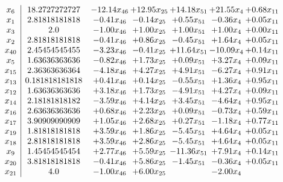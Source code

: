 \documentclass[8pt]{article}
\begin{document}
\[\begin{array}{c| c c@{\hskip 2pt} c@{\hskip 2pt} c@{\hskip 2pt} c@{\hskip 2pt} c@{\hskip 2pt} }
 x_{6}   &  18.2727272727 & -12.14 x_{46} & + 12.95 x_{25} & + 14.18 x_{51} & + 21.55 x_{4} & +  0.68 x_{11}\\
 x_{1}   &  2.81818181818 & -0.41 x_{46} & -0.14 x_{25} & +  0.55 x_{51} & -0.36 x_{4} & +  0.05 x_{11}\\
 x_{3}   &  2.0 & -1.00 x_{46} & +  1.00 x_{25} & +  1.00 x_{51} & +  1.00 x_{4} & +  0.00 x_{11}\\
 x_{2}   &  2.81818181818 & -0.41 x_{46} & +  0.86 x_{25} & -0.45 x_{51} & +  1.64 x_{4} & +  0.05 x_{11}\\
 x_{40}   &  2.45454545455 & -3.23 x_{46} & -0.41 x_{25} & + 11.64 x_{51} & -10.09 x_{4} & +  0.14 x_{11}\\
 x_{5}   &  1.63636363636 & -0.82 x_{46} & +  1.73 x_{25} & +  0.09 x_{51} & +  3.27 x_{4} & +  0.09 x_{11}\\
 x_{15}   &  2.36363636364 & -4.18 x_{46} & +  4.27 x_{25} & +  4.91 x_{51} & -6.27 x_{4} & +  0.91 x_{11}\\
 x_{13}   &  0.181818181818 & +  0.41 x_{46} & +  0.14 x_{25} & -0.55 x_{51} & +  1.36 x_{4} & +  0.95 x_{11}\\
 x_{12}   &  1.63636363636 & +  3.18 x_{46} & +  1.73 x_{25} & -4.91 x_{51} & +  4.27 x_{4} & +  0.09 x_{11}\\
 x_{14}   &  2.18181818182 & -3.59 x_{46} & +  4.14 x_{25} & +  3.45 x_{51} & -4.64 x_{4} & +  0.95 x_{11}\\
 x_{16}   &  2.63636363636 & +  0.68 x_{46} & +  2.23 x_{25} & +  0.09 x_{51} & -0.73 x_{4} & +  0.59 x_{11}\\
 x_{17}   &  3.90909090909 & +  1.05 x_{46} & +  2.68 x_{25} & +  0.27 x_{51} & -1.18 x_{4} & +  0.77 x_{11}\\
 x_{19}   &  1.81818181818 & +  3.59 x_{46} & +  1.86 x_{25} & -5.45 x_{51} & +  4.64 x_{4} & +  0.05 x_{11}\\
 x_{18}   &  2.81818181818 & +  3.59 x_{46} & +  2.86 x_{25} & -5.45 x_{51} & +  4.64 x_{4} & +  0.05 x_{11}\\
 x_{9}   &  1.45454545454 & +  2.77 x_{46} & +  5.59 x_{25} & -11.36 x_{51} & +  7.91 x_{4} & +  0.14 x_{11}\\
 x_{20}   &  3.81818181818 & -0.41 x_{46} & +  5.86 x_{25} & -1.45 x_{51} & -0.36 x_{4} & +  0.05 x_{11}\\
 x_{21}   &  4.0 & -1.00 x_{46} & +  6.00 x_{25} &   & -2.00 x_{4} &   \\

\end{array}\]
\end{document}
